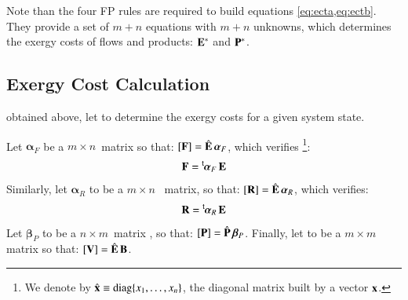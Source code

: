 \documentclass{ecos2018}
\begin{document}
Note than the four FP rules are required to build equations \cref{eq:ecta,eq:ectb}. They provide a set of $m+n$ equations with $m+n$ unknowns, which determines the exergy costs of flows and products: $\mathbf{E}^*$ and $\mathbf{P}^*$.

\subsection{Exergy Cost Calculation}
 obtained above, let to determine the exergy costs for a given system state.

Let $\bm{\alpha}_F$ be a $m\times n$~matrix  so that: ${[\mathbf{F}]=\hat{\mathbf{E}}\,\bm{\alpha}_F}$, which verifies
\footnote{We denote by $\hat{\mathbf{x}}\equiv\text{diag}\{x_1,\ldots,x_n\}$, the diagonal matrix built  by a vector $\mathbf{x}$.}:
\begin{equation}
\mathbf{F}=\prescript{\smash{\mathsf{t}}}{}{\mskip-1mu}\bm{\alpha}_F\,\mathbf{E}
\end{equation}
Similarly, let $\bm{\alpha}_R$ to be a  $m\times n$~ matrix, so that: ${\left[ \textbf{R} \right]}=\hat{\mathbf{E}}\,\bm{\alpha}_R$, which verifies: 
\begin{equation}
\mathbf{R} = \prescript{\smash{\mathsf{t}}}{}{\mskip-1mu}\bm{\alpha}_R \, \mathbf{E}
\end{equation}
Let  ${\bm{\beta}_P}$ to be a $ n \times m$~matrix , so that: ${\left[ \textbf{P} \right]=\hat{\mathbf{P}}\,\bm{\beta}_P}$.
Finally, let  to be a  $m \times m$ matrix so that: ${\left[ \textbf{V} \right]=\hat{\mathbf{E}}\,\mathbf{B}}$.
\end{document}
